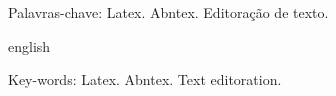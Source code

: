 
\begin{resumo}
\noindent
\lipsum[1-1] %

 \vspace{0.2cm}
    
 
 Palavras-chave: Latex. Abntex. Editoração de texto.
\end{resumo}

\begin{resumo}[Abstract]	
 	\begin{otherlanguage*}{english}
 	\noindent 
	\textit{
	\lipsum[1-1]  %
	} 
   \vspace{0.2cm}
 
   
    Key-words: Latex. Abntex. Text editoration.	
 	\end{otherlanguage*}
\end{resumo}